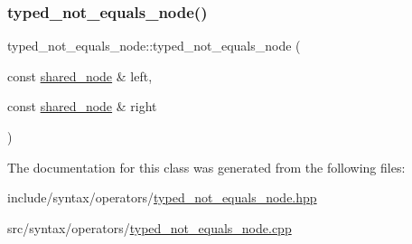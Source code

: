 \subsubsection{\texorpdfstring{typed\+\_\+not\+\_\+equals\+\_\+node()}{typed\_not\_equals\_node()}}
{\footnotesize\ttfamily typed\+\_\+not\+\_\+equals\+\_\+node\+::typed\+\_\+not\+\_\+equals\+\_\+node (\begin{DoxyParamCaption}\item[{const \hyperlink{namespacejawe_a3f307481d921b6cbb50cc8511fc2b544}{shared\+\_\+node} \&}]{left,  }\item[{const \hyperlink{namespacejawe_a3f307481d921b6cbb50cc8511fc2b544}{shared\+\_\+node} \&}]{right }\end{DoxyParamCaption})}



The documentation for this class was generated from the following files\+:\begin{DoxyCompactItemize}
\item 
include/syntax/operators/\hyperlink{typed__not__equals__node_8hpp}{typed\+\_\+not\+\_\+equals\+\_\+node.\+hpp}\item 
src/syntax/operators/\hyperlink{typed__not__equals__node_8cpp}{typed\+\_\+not\+\_\+equals\+\_\+node.\+cpp}\end{DoxyCompactItemize}
